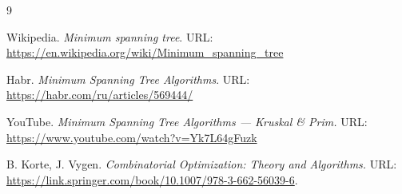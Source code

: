 
\begin{thebibliography}{9}

Wikipedia.
\textit{Minimum spanning tree}.
URL: \url{https://en.wikipedia.org/wiki/Minimum_spanning_tree}

Habr.
\textit{Minimum Spanning Tree Algorithms}.
URL: \url{https://habr.com/ru/articles/569444/}

YouTube.
\textit{Minimum Spanning Tree Algorithms — Kruskal \& Prim.}
URL: \url{https://www.youtube.com/watch?v=Yk7L64gFuzk}

B. Korte, J. Vygen.
\textit{Combinatorial Optimization: Theory and Algorithms.}
URL: \url{https://link.springer.com/book/10.1007/978-3-662-56039-6}.

\end{thebibliography}
